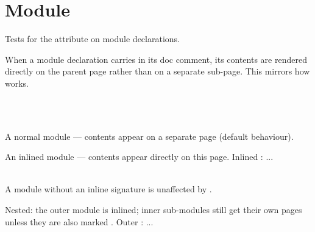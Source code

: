 \section{Module }\label{Module_inline}%
Tests for the  attribute on module declarations.

When a module declaration carries  in its doc comment, its contents are rendered directly on the parent page rather than on a separate sub-page. This mirrors how  works.

\label{Module_inline--module-Normal}\label{Module_inline-Normal}\begin{ocamlindent}\label{Module_inline-Normal--type-t}\\
\label{Module_inline-Normal--val-create}\\
\end{ocamlindent}%
\begin{ocamlindent}A normal module — contents appear on a separate page (default behaviour).\end{ocamlindent}%
\medbreak
\label{Module_inline--module-Inlined}An inlined module — contents appear directly on this page. Inlined :  .\allowbreak{}.\allowbreak{}.\allowbreak{} \label{Module_inline-Inlined--type-t}\\
\label{Module_inline-Inlined--val-create}\\
\label{Module_inline--module-Alias}\begin{ocamlindent}A module without an inline signature is unaffected by .\end{ocamlindent}%
\medbreak
\label{Module_inline--module-Outer}Nested: the outer module is inlined; inner sub-modules still get their own pages unless they are also marked . Outer :  .\allowbreak{}.\allowbreak{}.\allowbreak{} \label{Module_inline-Outer--module-Inner}\label{Module_inline-Outer-Inner}\begin{ocamlindent}\label{Module_inline-Outer-Inner--type-u}\\
\end{ocamlindent}%
